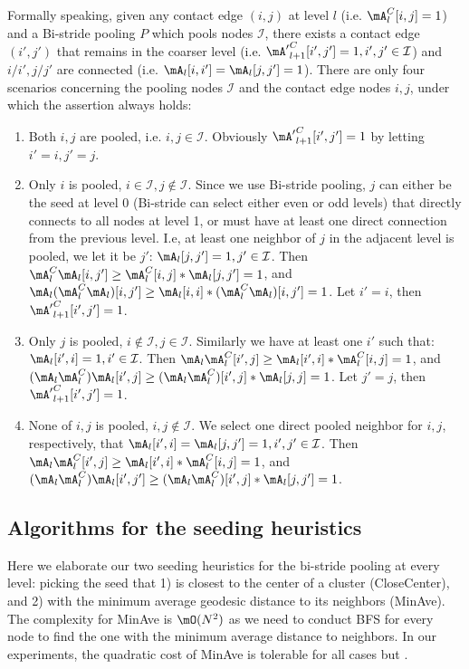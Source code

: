 Formally speaking, given any contact edge $(i,j)$ at level $l$ (i.e. $\mA^C_l[i,j]=1$) and a Bi-stride pooling $P$ which pools nodes $\mathcal{I}$, there exists a contact edge $(i',j')$ that remains in the coarser level (i.e. ${\mA'}^C_{l+1}[i',j']=1, i',j' \in \mathcal{I}$) and $i/i',j/j'$ are connected (i.e. $\mA_l[i,i']=\mA_l[j,j']=1$). There are only four scenarios concerning the pooling nodes $\mathcal{I}$ and the contact edge nodes $i,j$, under which the assertion always holds:
\begin{enumerate}
    \item Both $i,j$ are pooled, i.e. $i,j \in \mathcal{I}$. Obviously ${\mA'}^C_{l+1}[i',j']=1$ by letting $i'=i, j'=j$.
    \item Only $i$ is pooled, $i \in \mathcal{I}, j\notin \mathcal{I}$. Since we use Bi-stride pooling, $j$ can either be the seed at level 0 (Bi-stride can select either even or odd levels) that directly connects to all nodes at level 1, or must have at least one direct connection from the previous level. I.e, at least one neighbor of $j$ in the adjacent level is pooled, we let it be $j'$: $\mA_l[j,j']=1, j' \in \mathcal{I}$. Then $\mA^C_l \mA_l [i,j'] \geq \mA^C_l[i,j] * \mA_l[j,j'] = 1$, and $\mA_l (\mA^C_l \mA_l) [i,j'] \geq \mA_l[i,i] * (\mA^C_l \mA_l) [i,j']=1$. Let $i'=i$, then ${\mA'}^C_{l+1}[i',j']=1$.
    \item Only $j$ is pooled, $i \notin \mathcal{I}, j \in \mathcal{I}$. Similarly we have at least one $i'$ such that: $\mA_l[i',i]=1, i' \in \mathcal{I}$. Then $\mA_l \mA^C_l [i',j] \geq \mA_l[i',i] * \mA^C_l[i,j] = 1$, and $(\mA_l \mA^C_l) \mA_l [i',j] \geq (\mA_l \mA^C_l)[i',j] * \mA_l [j,j]=1$. Let $j'=j$, then ${\mA'}^C_{l+1}[i',j']=1$.
    \item None of $i,j$ is pooled, $i,j \notin \mathcal{I}$. We select one direct pooled neighbor for $i,j$, respectively, that $\mA_l[i',i]=\mA_l[j,j']=1, i',j' \in \mathcal{I}$. Then $\mA_l \mA^C_l [i',j] \geq \mA_l[i',i] * \mA^C_l[i,j] = 1$, and $(\mA_l \mA^C_l) \mA_l [i',j'] \geq (\mA_l \mA^C_l)[i',j] * \mA_l [j,j']=1$.
\end{enumerate}

\subsection{Algorithms for the seeding heuristics}
\label{sec:appdx:algo}
Here we elaborate our two seeding heuristics for the bi-stride pooling at every level: picking the seed that 1) is closest to the center of a cluster (CloseCenter), and 2) with the minimum average geodesic distance to its neighbors (MinAve). The complexity for MinAve is $\mO(N^2)$ as we need to conduct BFS for every node to find the one with the minimum average distance to neighbors. In our experiments, the quadratic cost of MinAve is tolerable for all cases but \fonts.

